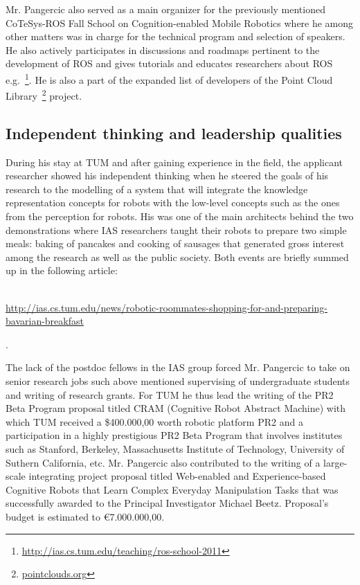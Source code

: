 Mr. Pangercic also served as a main organizer for the previously mentioned CoTeSys-ROS Fall School on 
Cognition-enabled Mobile Robotics where he among other matters was in charge for the technical
program and selection of speakers. He also actively participates in discussions and roadmaps
pertinent to the development of ROS and gives tutorials and educates researchers about
ROS e.g.~\footnote{\url{http://ias.cs.tum.edu/teaching/ros-school-2011}}. He is also a part of
the expanded list of developers of the Point Cloud Library~\footnote{\url{pointclouds.org}} project.
 
\subsection{Independent thinking and leadership qualities} 
During his stay at TUM and after gaining experience in the field, the applicant researcher 
showed his independent thinking when he steered the goals of his research to the
modelling of a system that will integrate the knowledge representation concepts for robots 
with the low-level concepts such as the ones from the perception for robots.
His was one of the main architects behind the two demonstrations where IAS researchers
taught their robots to prepare two simple meals: baking of pancakes and cooking of 
sausages that generated gross interest among the research as well as the public
society. Both events are briefly summed up in the following 
article:\\~\begin{small}\url{http://ias.cs.tum.edu/news/robotic-roommates-shopping-for-and-preparing-bavarian-breakfast}\end{small}.

The lack of the postdoc fellows in the IAS group forced Mr. Pangercic to take on senior research
jobs such above mentioned supervising of undergraduate students and writing of research grants.
For TUM he thus lead the writing of the PR2 Beta Program proposal titled CRAM (Cognitive Robot Abstract Machine)
with which TUM received a \$400.000,00 worth robotic platform PR2 and a participation in a highly 
prestigious PR2 Beta Program that involves institutes such as Stanford, Berkeley, Massachusetts Institute of Technology, University
of Suthern California, etc.
Mr. Pangercic also contributed to the writing of a large-scale integrating project proposal titled Web-enabled and Experience-based 
Cognitive Robots that Learn Complex Everyday Manipulation Tasks that was successfully awarded to 
the Principal Investigator Michael Beetz. Proposal's budget is estimated to \euro7.000.000,00.

